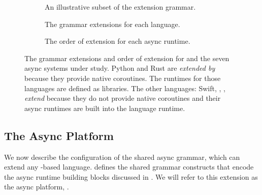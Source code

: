 \begin{figure}[t]
  \begin{subfigure}[t]{\textwidth}
    
    \cprotect\caption{An illustrative subset of the \lasync extension grammar.}
    \label{fig:lasync:grammar}
  \end{subfigure}\vspace{1em}
  \begin{subfigure}[t]{0.45\textwidth}
    \vspace{0cm}
    
    \cprotect\caption{The grammar extensions for each language.}
    \label{fig:langs:exts}
  \end{subfigure}\hfill%
  \begin{subfigure}[t]{0.5\textwidth}
    \vspace{0cm}
    
    \cprotect\caption{The order of extension for each async runtime.}
    \label{fig:langs:lineage}
  \end{subfigure}
  \cprotect\caption{The grammar extensions and order of extension for \lasync and the seven async systems under study. Python and Rust are \emph{extended by} \lasync because they provide native coroutines. The runtimes for those languages are defined as libraries. The other languages: Swift, \Js, \CSharp, \emph{extend} \lasync because they do not provide native coroutines and their async runtimes are built into the language runtime.}
  \label{fig:platform}
\end{figure}

\subsection{The Async Platform}

We now describe the configuration of the shared async grammar, which can extend any \lc-based language.  defines the shared grammar constructs that encode the async runtime building blocks discussed in . We will refer to this extension as the async platform, \lasync.

